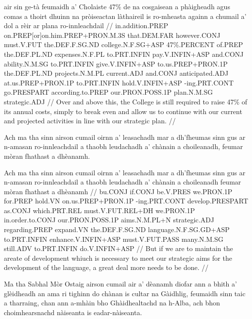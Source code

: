 \documentclass[a4paper,10pt]{article}
\begin{document}
\vspace{4mm}
 air sin ge-tà feumaidh a' Cholaiste 47\% de na cosgaisean a phàigheadh agus comas a thoirt dhuinn na pròiseactan làthaireil is ro-mheasta againn a chumail a' dol {a rèir} ar plana ro-innleachdail  //
\glb in.addition.PREP on.PREP[or]on.him.PREP+PRON.M.3S that.DEM.FAR however.CONJ must.V.FUT the.DEF.F.SG.ND college.N.F.SG+ASP 47\%.PERCENT of.PREP the.DEF.PL.ND expenses.N.F.PL to.PRT.INFIN pay.V.INFIN+ASP and.CONJ ability.N.M.SG to.PRT.INFIN give.V.INFIN+ASP to.us.PREP+PRON.1P the.DEF.PL.ND projects.N.M.PL current.ADJ and.CONJ anticipated.ADJ at.us.PREP+PRON.1P to.PRT.INFIN hold.V.INFIN+ASP -ing.PRT.CONT go.PRESPART according.to.PREP our.PRON.POSS.1P plan.N.M.SG strategic.ADJ  //
\glft Over and above this, the College is still required to raise 47\% of its annual costs, simply to break even and allow us to continue with our current and projected activities in line with our strategic plan. //
\endgl
\xe

\ex
\begingl
\glpre Ach ma tha sinn airson cumail oirnn a' leasachadh mar a dh'fheumas sinn gus ar n-amasan ro-innleachdail a thaobh leudachadh a' chànain a choileanadh, feumar mòran fhathast a dhèanamh. 

\vspace{4mm}
\gla Ach ma tha sinn airson cumail oirnn a' leasachadh mar a dh'fheumas sinn gus ar n-amasan ro-innleachdail {a thaobh} leudachadh a' chànain a choileanadh feumar mòran fhathast a dhèanamh  //
\glb bu.CONJ if.CONJ be.V.PRES we.PRON.1P for.PREP hold.VN on.us.PREP+PRON.1P -ing.PRT.CONT develop.PRESPART as.CONJ which.PRT.REL must.V.FUT.REL+DH we.PRON.1P in.order.to.CONJ our.PRON.POSS.1P aims.N.M.PL+N strategic.ADJ regarding.PREP expand.VN the.DEF.F.SG.ND language.N.F.SG.GD+ASP to.PRT.INFIN enhance.V.INFIN+ASP must.V.FUT.PASS many.N.M.SG still.ADV to.PRT.INFIN do.V.INFIN+ASP  //
\glft But if we are to maintain the areate of development whiuch is necessary to meet our strategic aims for the development of the language, a great deal more needs to be done. //
\endgl
\xe

\ex
\begingl
\glpre Ma tha Sabhal Mòr Ostaig airson cumail air a' dèanamh diofar ann a bhith a' glèidheadh an ama ri tighinn do chànan is cultar na Gàidhlig, feumaidh sinn taic a tharraing, chan ann a-mhàin bho Ghàidhealtachd na h-Alba, ach bhon choimhearsnachd nàiseanta is eadar-nàiseanta. 
\end{document}
